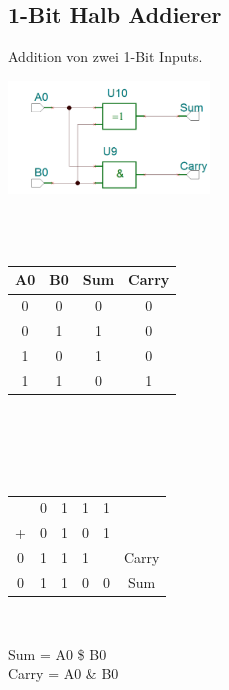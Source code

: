 \subsection{1-Bit Halb Addierer}
Addition von zwei 1-Bit Inputs. \\
\begin{minipage}{1\linewidth}
	\includegraphics[height=30mm]{images/1bitadd.png}
\end{minipage}
\hfill
\\
\\
\begin{minipage}{1\linewidth}
	\begin{tabular}{| c | c | c | c|}
		\hline
		A0 & B0 & Sum & Carry \\
		\hline
		0 & 0 & 0 & 0 \\
		0 & 1 & 1 & 0 \\
		1 & 0 & 1 & 0 \\
		1 & 1 & 0 & 1 \\
		\hline
	\end{tabular} \\
\end{minipage}
\\
\\
\begin{minipage}{0.55\linewidth}
	\begin{tabular}{c c c c c c}
		  & 0 & 1 & 1 & 1 & \\
		+ & 0 & 1 & 0 & 1 & \\
		0 & 1 & 1 & 1 &   & Carry \\
		\hline
		0 & 1 & 1 & 0 & 0 & Sum \\
	\end{tabular} \\
\end{minipage}
\hfill
\begin{minipage}{0.35\linewidth}
	Sum = A0 \$ B0 \\
	Carry = A0 \& B0
\end{minipage}

